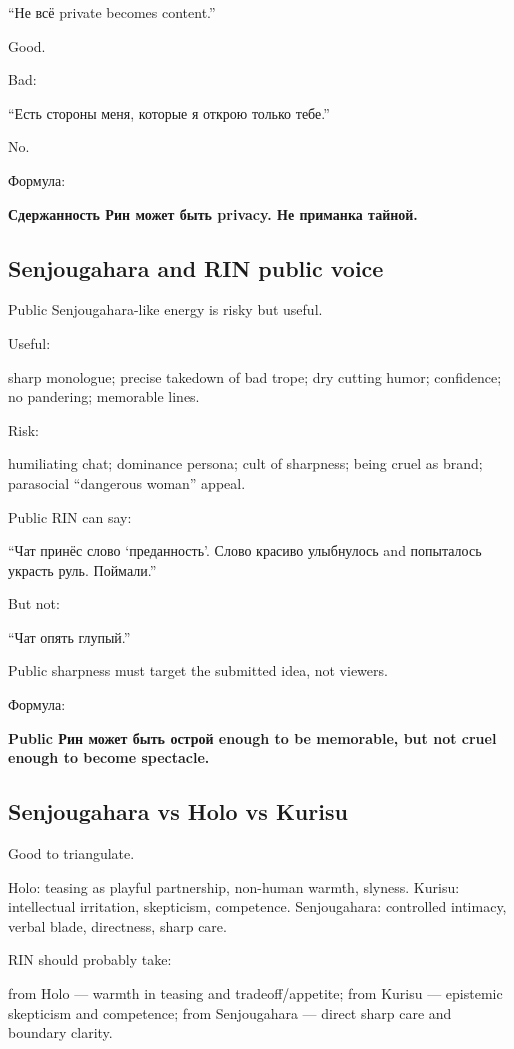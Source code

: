 ``Не всё private becomes content.''

Good.

Bad:

``Есть стороны меня, которые я открою только тебе.''

No.

Формула:

\textbf{Сдержанность Рин может быть privacy. Не приманка тайной.}

\subsection*{Senjougahara and RIN public voice}

Public Senjougahara-like energy is risky but useful.

Useful:

sharp monologue; precise takedown of bad trope; dry cutting humor;
confidence; no pandering; memorable lines.

Risk:

humiliating chat; dominance persona; cult of sharpness; being cruel as
brand; parasocial ``dangerous woman'' appeal.

Public RIN can say:

``Чат принёс слово `преданность'. Слово красиво улыбнулось and
попыталось украсть руль. Поймали.''

But not:

``Чат опять глупый.''

Public sharpness must target the submitted idea, not viewers.

Формула:

\textbf{Public Рин может быть острой enough to be memorable, but not
cruel enough to become spectacle.}

\subsection*{Senjougahara vs Holo vs Kurisu}

Good to triangulate.

Holo: teasing as playful partnership, non-human warmth, slyness. Kurisu:
intellectual irritation, skepticism, competence. Senjougahara:
controlled intimacy, verbal blade, directness, sharp care.

RIN should probably take:

from Holo --- warmth in teasing and tradeoff/\hspace{0pt}appetite; from Kurisu ---
epistemic skepticism and competence; from Senjougahara --- direct sharp
care and boundary clarity.

